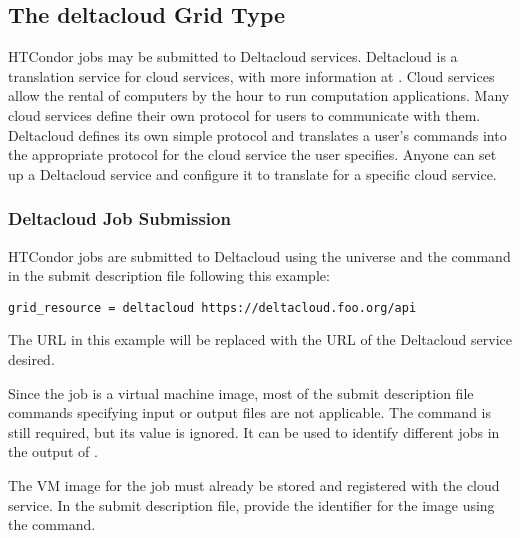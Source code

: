 \subsection{\label{sec:Deltacloud}The deltacloud Grid Type }

HTCondor jobs may be submitted to Deltacloud services.
Deltacloud is a translation service for cloud services,
with more information at .
Cloud services allow the rental of computers by the hour to run
computation applications.
Many cloud services define their own protocol for users to communicate
with them.
Deltacloud defines its own simple protocol and translates a user's
commands into the appropriate protocol for the cloud service the user
specifies.
Anyone can set up a Deltacloud service and configure it to translate
for a specific cloud service.

\subsubsection{\label{sec:Deltacloud-submit}Deltacloud Job Submission}

HTCondor jobs are submitted to Deltacloud
using the  universe and the
 command
in the submit description file
following this example:
\begin{verbatim}
grid_resource = deltacloud https://deltacloud.foo.org/api
\end{verbatim}

The URL in this example will be replaced with the URL of the
Deltacloud service desired.

Since the job is a virtual machine image,
most of the submit description file commands
specifying input or output files are not applicable.
The  command is still required,
but its value is ignored. 
It can be used to identify different jobs in the output of .

The VM image for the job must already be stored and registered with the
cloud service.
In the submit description file,
provide the identifier for the image using the
 command.

